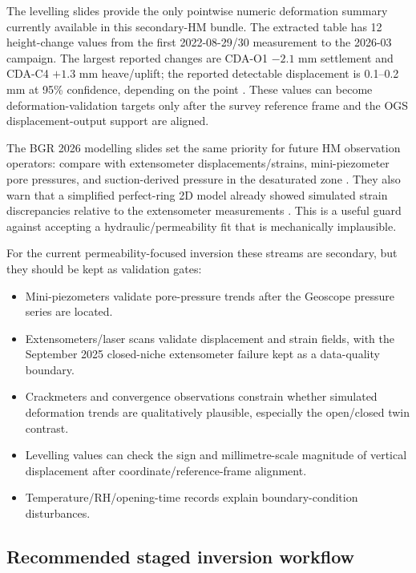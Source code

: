 The levelling slides provide the only pointwise numeric deformation summary currently
available in this secondary-HM bundle.  The extracted table has 12 height-change
values from the first 2022-08-29/30 measurement to the 2026-03 campaign.  The largest
reported changes are CDA-O1 \(-2.1\) mm settlement and CDA-C4 \(+1.3\) mm
heave/uplift; the reported detectable displacement is 0.1--0.2 mm at 95\% confidence,
depending on the point \cite[PDF pp.~5--6]{LevellingTD2026Local}.  These values can
become deformation-validation targets only after the survey reference frame and the
OGS displacement-output support are aligned.

The BGR 2026 modelling slides set the same priority for future HM observation
operators: compare with extensometer displacements/strains, mini-piezometer pore
pressures, and suction-derived pressure in the desaturated zone
\cite[PDF p.~2]{BGRModellingTD2026Local}.  They also warn that a simplified
perfect-ring 2D model already showed simulated strain discrepancies relative to the
extensometer measurements \cite[PDF p.~15]{BGRModellingTD2026Local}.  This is a useful
guard against accepting a hydraulic/permeability fit that is mechanically implausible.

For the current permeability-focused inversion these streams are secondary, but they
should be kept as validation gates:

\begin{itemize}[leftmargin=1.5em]
  \item Mini-piezometers validate pore-pressure trends after the Geoscope pressure
  series are located.
  \item Extensometers/laser scans validate displacement and strain fields, with the
  September 2025 closed-niche extensometer failure kept as a data-quality boundary.
  \item Crackmeters and convergence observations constrain whether simulated
  deformation trends are qualitatively plausible, especially the open/closed twin
  contrast.
  \item Levelling values can check the sign and millimetre-scale magnitude of vertical
  displacement after coordinate/reference-frame alignment.
  \item Temperature/RH/opening-time records explain boundary-condition disturbances.
\end{itemize}

\subsection{Recommended staged inversion workflow}


